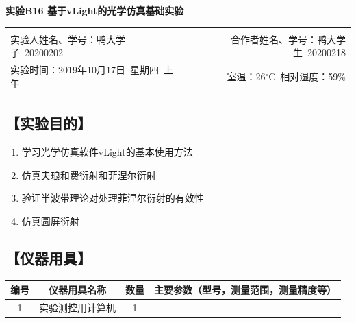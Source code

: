 \documentclass[12pt,a4paper,UTF8]{ctexart}
\begin{document}

\begin{center}
\LARGE\textbf{实验B16 基于vLight的光学仿真基础实验}
\end{center}

\begin{doublespacing}
	\centering
	\begin{tabular}{lr}
	 & \\
	{实验人姓名、学号：鸭大学子~20200202} & {合作者姓名、学号：鸭大学生~20200218}\\
	{实验时间：2019年10月17日~星期四~上午} & { 室温：26$^{\circ}$C~相对湿度：59\%}
	\end{tabular}
\end{doublespacing}



\subsection*{【实验目的】}
	\begin{enumerate}[(1)]
		\item 学习光学仿真软件vLight的基本使用方法
		\item 仿真夫琅和费衍射和菲涅尔衍射
		\item 验证半波带理论对处理菲涅尔衍射的有效性
		\item 仿真圆屏衍射
	\end{enumerate}

\subsection*{【仪器用具】}


	\begin{table}[htbp]
	  \centering
	    \begin{tabular}{cccp{20em}}
	    \toprule
	    编号    & 仪器用具名称 & 数量    & 主要参数（型号，测量范围，测量精度等） \\
	    \midrule
	    1     & 实验测控用计算机 & 1     &  \\
	    \bottomrule
	    \end{tabular}%
	\end{table}%
\end{document}
